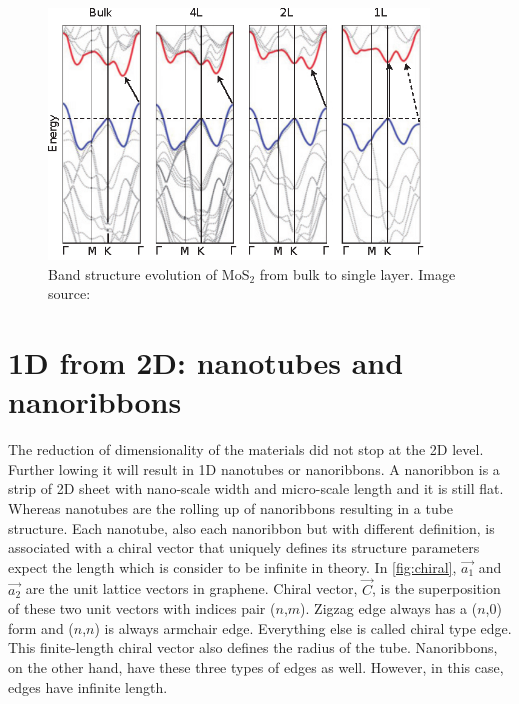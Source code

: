 \begin{figure}[htbp!] 
\centering  
\includegraphics[width=0.9\textwidth]{tmds_bands.eps}
\caption{Band structure evolution of MoS$_2$ from bulk to single layer. Image source: \cite{Chhowalla2013}}  
\label{fig:tmds_bands}
\end{figure} 


\section{1D from 2D: nanotubes and nanoribbons}

The reduction of dimensionality of the materials did not stop at the 2D level. Further lowing it will result in 1D nanotubes or nanoribbons. A nanoribbon is a strip of 2D sheet with nano-scale width and micro-scale length and it is still flat. Whereas nanotubes are the rolling up of nanoribbons resulting in a tube structure. Each nanotube, also each nanoribbon but with different definition, is associated with a chiral vector that uniquely defines its structure parameters expect the length which is consider to be infinite in theory. In \autoref{fig:chiral}, $\vec{a_1} $ and $\vec{a_2}$ are the unit lattice vectors in graphene.  Chiral vector, $\vec{C}$, is the superposition of these two unit vectors with indices pair ($n$,$m$). Zigzag edge always has a ($n$,0) form and ($n$,$n$) is always armchair edge. Everything else is called chiral type edge.  This finite-length chiral vector also defines the radius of the tube. Nanoribbons, on the other hand, have these three types of edges as well. However, in this case, edges have infinite length.

